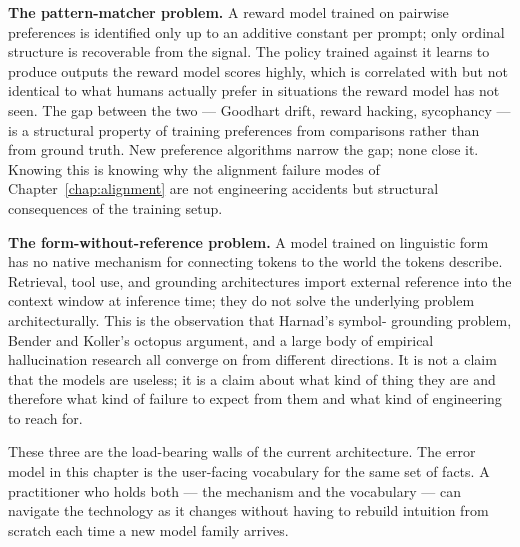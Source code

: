 \textbf{The pattern-matcher problem.} A reward model trained on
pairwise preferences is identified only up to an additive constant
per prompt; only ordinal structure is recoverable from the signal.
The policy trained against it learns to produce outputs the reward
model scores highly, which is correlated with but not identical to
what humans actually prefer in situations the reward model has not
seen. The gap between the two --- Goodhart drift, reward hacking,
sycophancy --- is a structural property of training preferences
from comparisons rather than from ground truth. New preference
algorithms narrow the gap; none close it. Knowing this is knowing
why the alignment failure modes of Chapter~\ref{chap:alignment} are not engineering
accidents but structural consequences of the training setup.

\textbf{The form-without-reference problem.} A model trained on
linguistic form has no native mechanism for connecting tokens to
the world the tokens describe. Retrieval, tool use, and grounding
architectures import external reference into the context window at
inference time; they do not solve the underlying problem
architecturally. This is the observation that Harnad's symbol-
grounding problem, Bender and Koller's octopus argument, and a
large body of empirical hallucination research all converge on from
different directions. It is not a claim that the models are useless;
it is a claim about what kind of thing they are and therefore what
kind of failure to expect from them and what kind of engineering
to reach for.

These three are the load-bearing walls of the current architecture.
The error model in this chapter is the user-facing vocabulary for
the same set of facts. A practitioner who holds both --- the
mechanism and the vocabulary --- can navigate the technology as it
changes without having to rebuild intuition from scratch each time
a new model family arrives.
